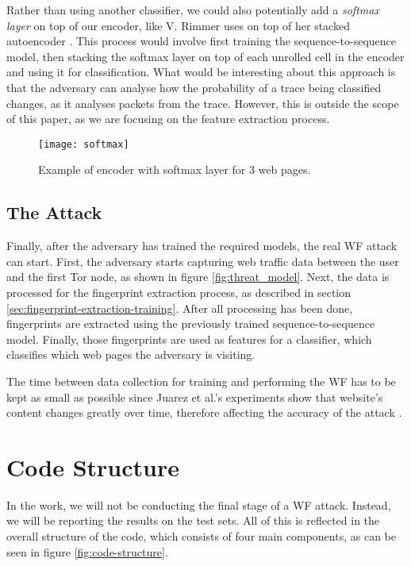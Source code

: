 Rather than using another classifier, we could also potentially add a \textit{softmax layer} on top of our encoder, like V. Rimmer uses on top of her stacked autoencoder \cite{deeplearningthesis}.
This process would involve first training the sequence-to-sequence model, then stacking the softmax layer on top of each unrolled cell in the encoder and using it for classification.
What would be interesting about this approach is that the adversary can analyse how the probability of a trace being classified changes, as it analyses packets from the trace.
However, this is outside the scope of this paper, as we are focusing on the feature extraction process.

\begin{figure}[ht]
  \centering
  \texttt{[image: softmax]}
  \caption{Example of encoder with softmax layer for 3 web pages.}
  \label{fig:softmax}
\end{figure}

\newpage

\subsection{The Attack}

Finally, after the adversary has trained the required models, the real WF attack can start.
First, the adversary starts capturing web traffic data between the user and the first Tor node, as shown in figure \ref{fig:threat_model}.
Next, the data is processed for the fingerprint extraction process, as described in section \ref{sec:fingerprint-extraction-training}.
After all processing has been done, fingerprints are extracted using the previously trained sequence-to-sequence model.
Finally, those fingerprints are used as features for a classifier, which classifies which web pages the adversary is visiting.

The time between data collection for training and performing the WF has to be kept as small as possible since Juarez et al.'s experiments show that website's content changes greatly over time, therefore affecting the accuracy of the attack \cite{wfpevaluation}.

\section{Code Structure} \label{sec:code-structure}

In the work, we will not be conducting the final stage of a WF attack.
Instead, we will be reporting the results on the test sets.
All of this is reflected in the overall structure of the code, which consists of four main components, as can be seen in figure \ref{fig:code-structure}.


